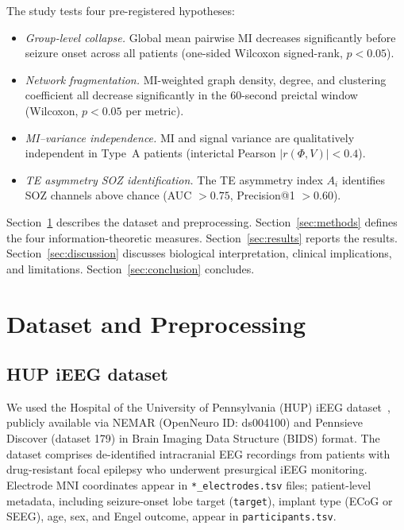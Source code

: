 \documentclass[a4paper,fleqn]{cas-dc}
\begin{document}
The study tests four pre-registered hypotheses:
\begin{itemize}
  \item[\textbf{H1}] \textit{Group-level collapse.} Global mean pairwise
        MI decreases significantly before seizure onset across all
        patients (one-sided Wilcoxon signed-rank, $p < 0.05$).
  \item[\textbf{H2}] \textit{Network fragmentation.} MI-weighted graph
        density, degree, and clustering coefficient all decrease
        significantly in the 60-second preictal window (Wilcoxon,
        $p < 0.05$ per metric).
  \item[\textbf{H3}] \textit{MI--variance independence.} MI and signal
        variance are qualitatively independent in Type~A patients
        (interictal Pearson $|r(\Phi, V)| < 0.4$).
  \item[\textbf{H4}] \textit{TE asymmetry SOZ identification.} The TE
        asymmetry index $A_i$ identifies SOZ channels above chance
        (AUC $> 0.75$, Precision@1 $> 0.60$).
\end{itemize}

Section~\ref{sec:data} describes the dataset and preprocessing.
Section~\ref{sec:methods} defines the four information-theoretic measures.
Section~\ref{sec:results} reports the results.
Section~\ref{sec:discussion} discusses biological interpretation,
clinical implications, and limitations.
Section~\ref{sec:conclusion} concludes.

\section{Dataset and Preprocessing}
\label{sec:data}

\subsection{HUP iEEG dataset}

We used the Hospital of the University of Pennsylvania (HUP) iEEG
dataset~\citep{bernabei2023}, publicly available via NEMAR (OpenNeuro ID:
ds004100) and Pennsieve Discover (dataset 179) in Brain Imaging Data
Structure (BIDS) format.
%
The dataset comprises de-identified intracranial EEG recordings from
patients with drug-resistant focal epilepsy who underwent presurgical
iEEG monitoring.
%
Electrode MNI coordinates appear in \texttt{*\_electrodes.tsv} files;
patient-level metadata, including seizure-onset lobe target
(\texttt{target}), implant type (ECoG or SEEG), age, sex, and Engel
outcome, appear in \texttt{participants.tsv}.
\end{document}
